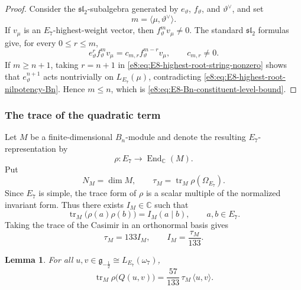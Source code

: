 \documentclass[11pt,reqno]{amsart}
\newtheorem{lemma}[theorem]{Lemma}
\theoremstyle{definition}
\theoremstyle{remark}
\providecommand{\C}{\mathbb{C}}
\providecommand{\g}{\mathfrak{g}}
\providecommand{\tr}{\operatorname{tr}}
\begin{document}
\begin{proof}
Consider the $\mathfrak{sl}_2$-subalgebra generated by
$e_{\vartheta}$, $f_{\vartheta}$, and $\vartheta^{\vee}$, and set
\begin{equation*}
  m=\langle\mu,\vartheta^{\vee}\rangle.
\end{equation*}
If $v_{\mu}$ is an $E_7$-highest-weight vector, then
$f_{\vartheta}^{m}v_{\mu}\neq0$.  The standard
$\mathfrak{sl}_2$ formulas give, for every $0\le r\le m$,
\begin{equation}
  e_{\vartheta}^{r}f_{\vartheta}^{m}v_{\mu}
  =c_{m,r}f_{\vartheta}^{m-r}v_{\mu},
  \qquad c_{m,r}\neq0.
  \label{e8:eq:E8-highest-root-string-nonzero}
\end{equation}
If $m\ge n+1$, taking $r=n+1$ in
\eqref{e8:eq:E8-highest-root-string-nonzero} shows that
$e_{\vartheta}^{n+1}$ acts nontrivially on $L_{E_7}(\mu)$, contradicting
\eqref{e8:eq:E8-highest-root-nilpotency-Bn}.  Hence $m\le n$, which is
\eqref{e8:eq:E8-Bn-constituent-level-bound}.
\end{proof}

\subsubsection{The trace of the quadratic term}


Let $M$ be a finite-dimensional $B_n$-module and denote the resulting
$E_7$-representation by
\begin{equation*}
  \rho:E_7\longrightarrow\operatorname{End}_{\C}(M).
\end{equation*}
Put
\begin{equation*}
  N_M=\dim M,
  \qquad
  \tau_M=\tr_M\rho(\Omega_{E_7}).
\end{equation*}
Since $E_7$ is simple, the trace form of $\rho$ is a scalar multiple of the
normalized invariant form.  Thus there exists $I_M\in\C$ such that
\begin{equation}
  \tr_M\bigl(\rho(a)\rho(b)\bigr)
  =I_M(a\mid b),
  \qquad a,b\in E_7.
  \label{e8:eq:E8-Dynkin-index-definition}
\end{equation}
Taking the trace of the Casimir in an orthonormal basis gives
\begin{equation}
  \tau_M=133I_M,
  \qquad
  I_M=\frac{\tau_M}{133}.
  \label{e8:eq:E8-Dynkin-index-Casimir-trace}
\end{equation}

\begin{lemma}
\label{e8:lem:E8-trace-quadratic-term}
For all $u,v\in\g_{-\frac12}\cong L_{E_7}(\omega_7)$,
\begin{equation}
  \tr_M\rho\bigl(Q(u,v)\bigr)
  =\frac{57}{133}\,\tau_M\,\langle u,v\rangle.
  \label{e8:eq:E8-trace-quadratic-term}
\end{equation}
\end{lemma}
\end{document}
